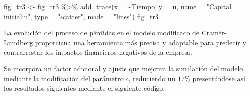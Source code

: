 \documentclass[
  us-letterpaper,
]{scrreprt}
\newenvironment{Shaded}{\begin{snugshade}}{\end{snugshade}}
\newcommand{\AttributeTok}[1]{\textcolor[rgb]{0.40,0.45,0.13}{#1}}
\newcommand{\FunctionTok}[1]{\textcolor[rgb]{0.28,0.35,0.67}{#1}}
\newcommand{\NormalTok}[1]{\textcolor[rgb]{0.00,0.23,0.31}{#1}}
\newcommand{\OtherTok}[1]{\textcolor[rgb]{0.00,0.23,0.31}{#1}}
\newcommand{\SpecialCharTok}[1]{\textcolor[rgb]{0.37,0.37,0.37}{#1}}
\newcommand{\StringTok}[1]{\textcolor[rgb]{0.13,0.47,0.30}{#1}}
\theoremstyle{plain}
\theoremstyle{plain}
\theoremstyle{definition}
\theoremstyle{remark}
\begin{document}
\begin{Shaded}
\begin{Highlighting}[]
\NormalTok{fig\_tr3 }\OtherTok{\textless{}{-}}\NormalTok{ fig\_tr3 }\SpecialCharTok{\%\textgreater{}\%} \FunctionTok{add\_trace}\NormalTok{(}\AttributeTok{x =} \SpecialCharTok{\textasciitilde{}}\NormalTok{Tiempo, }\AttributeTok{y =}\NormalTok{ u,}
           \AttributeTok{name =} \StringTok{"Capital inicial:u"}\NormalTok{, }
           \AttributeTok{type =} \StringTok{"scatter"}\NormalTok{, }\AttributeTok{mode =} \StringTok{"lines"}\NormalTok{)}
\NormalTok{fig\_tr3}
\end{Highlighting}
\end{Shaded}

\begin{figure}


\caption{\label{fig-fig-trayectoria3pdf}}

\end{figure}%

La evolución del proceso de pérdidas en el modelo modificado de
Cramér-Lundberg proporciona una herramienta más precisa y adaptable para
predecir y contrarrestar los impactos financieros negativos de la
empresa.

Se incorpora un factor adicional y ajuste que mejoran la simulación del
modelo, mediante la modificación del parámetro \(c\), reduciendo un
\(17\%\) presentándose así los resultados siguientes mediante el
siguiente código.
\end{document}

